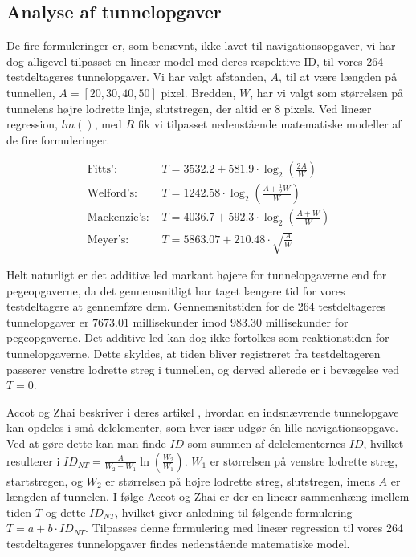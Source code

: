\subsection*{Analyse af tunnelopgaver}
De fire formuleringer er, som benævnt, ikke lavet til navigationsopgaver, vi har dog alligevel tilpasset en lineær model med deres respektive ID, til vores 264 testdeltageres tunnelopgaver. Vi har valgt afstanden, $A$, til at være længden på tunnellen, $A=[20,30,40,50]$ pixel. Bredden, $W$, har vi valgt som størrelsen på tunnelens højre lodrette linje, slutstregen, der altid er $8$ pixels. Ved lineær regression, $lm()$, med $R$ fik vi tilpasset nedenstående matematiske modeller af de fire formuleringer.

\begin{align*}
\text{Fitts': } &T = 3532.2 + 581.9\cdot \log_2\left(\frac{2A}{W}\right)\\
\text{Welford's: } &T =  1242.58\cdot \log_2\left(\frac{A+\frac{1}{2}W}{W}\right)\\
\text{Mackenzie's: } &T = 4036.7 + 592.3\cdot \log_2\left(\frac{A+W}{W}\right)\\
\text{Meyer's: } &T = 5863.07 + 210.48 \cdot \sqrt{\frac{A}{W}}
\end{align*}

Helt naturligt er det additive led markant højere for tunnelopgaverne end for pegeopgaverne, da det gennemsnitligt har taget længere tid for vores testdeltagere at gennemføre dem. Gennemsnitstiden for de 264 testdeltageres tunnelopgaver er $7673.01$ millisekunder imod $983.30$ millisekunder for pegeopgaverne. Det additive led kan dog ikke fortolkes som reaktionstiden for tunnelopgaverne. Dette skyldes, at tiden bliver registreret fra testdeltageren passerer venstre lodrette streg i tunnellen, og derved allerede er i bevægelse ved $T=0$.

Accot og Zhai beskriver i deres artikel \cite{accot1997}, hvordan en indsnævrende tunnelopgave kan opdeles i små delelementer, som hver især udgør én lille navigationsopgave. Ved at gøre dette kan man finde $ID$ som summen af delelementernes $ID$, hvilket resulterer i $ID_{NT} = \frac{A}{W_2-W_1}\ln\left(\frac{W_2}{W_1}\right)$. $W_1$ er størrelsen på venstre lodrette streg, startstregen, og $W_2$ er størrelsen på højre lodrette streg, slutstregen, imens $A$ er længden af tunnelen. I følge Accot og Zhai er der en lineær sammenhæng imellem tiden $T$ og dette $ID_{NT}$, hvilket giver anledning til følgende formulering $T = a+b\cdot ID_{NT}$. Tilpasses denne formulering med lineær regression til vores 264 testdeltageres tunnelopgaver findes nedenstående matematiske model.

